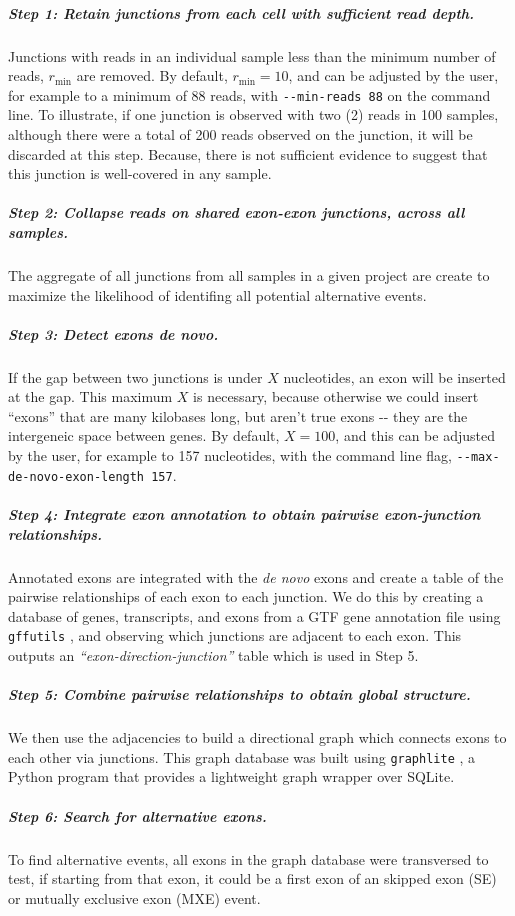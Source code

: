 \subparagraph{Step 1: Retain junctions from each cell with sufficient read depth.} Junctions with reads in an individual sample less than the minimum number of reads, $r_{\min}$ are removed. By default, $r_{\min} = 10$, and can be adjusted by the user, for example to a minimum of 88 reads, with \texttt{-{}-min-reads~88} on the command line. To illustrate, if one junction is observed with two (2) reads in 100 samples, although there were a total of 200 reads observed on the junction, it will be discarded at this step. Because, there is not sufficient evidence to suggest that this junction is well-covered in any sample.

\subparagraph{Step 2: Collapse reads on shared exon-exon junctions, across all samples.} The aggregate of all junctions from all samples in a given project are create to maximize the likelihood of identifing all potential alternative events.

\subparagraph{Step 3: Detect exons \emph{de novo}.} If the gap between two junctions is under $X$ nucleotides, an exon will be inserted at the gap. This maximum $X$ is necessary, because otherwise we could insert ``exons'' that are many kilobases long, but aren't true exons -{}- they are the intergeneic space between genes. By default, $X = 100$, and this can be adjusted by the user, for example to 157 nucleotides, with the command line flag, \texttt{-{}-max-de-novo-exon-length~157}.

\subparagraph{Step 4: Integrate exon annotation to obtain pairwise exon-junction relationships.} Annotated exons are integrated with the \emph{de novo} exons and create a table of the pairwise relationships of each exon to each junction. We do this by creating a database of genes, transcripts, and exons from a GTF gene annotation file using \texttt{gffutils} \cite{gffutils:sP8uhXuv}, and observing which junctions are adjacent to each exon. This outputs an \emph{``exon-direction-junction''} table which is used in Step 5.

\subparagraph{Step 5: Combine pairwise relationships to obtain global structure.} We then use the adjacencies to build a directional graph which connects exons to each other via junctions. This graph database was built using \texttt{graphlite} \cite{graphlite:vt}, a Python program that provides a lightweight graph wrapper over SQLite.

\subparagraph{Step 6: Search for alternative exons.} To find alternative events, all exons in the graph database were transversed to test, if starting from that exon, it could be a first exon of an skipped exon (SE) or mutually exclusive exon (MXE) event.

